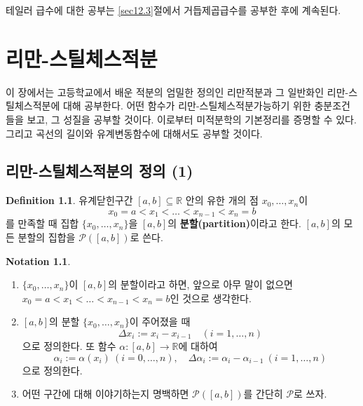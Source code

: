 \documentclass[11pt]{book}
\numberwithin{equation}{chapter}
\def\RR{\mathbb{R}}
\def\calP{\mathcal{P}}
\theoremstyle{definition}
\newtheorem{defn}[thm]{Definition}
\newtheorem{notn}[thm]{Notation}
\newenvironment{enum}
	{\begin{enumerate}[label=(\alph*), leftmargin=2\parindent]}
	{\end{enumerate}}
\begin{document}
테일러 급수에 대한 공부는 \ref{sec12.3}절에서 거듭제곱급수를 공부한 후에 계속된다.



\chapter{리만-스틸체스적분}

이 장에서는 고등학교에서 배운 적분의 엄밀한 정의인 리만적분과 그 일반화인 리만-스틸체스적분에 대해 공부한다. 어떤 함수가 리만-스틸체스적분가능하기 위한 충분조건들을 보고, 그 성질을 공부할 것이다. 이로부터 미적분학의 기본정리를 증명할 수 있다. 그리고 곡선의 길이와 유계변동함수에 대해서도 공부할 것이다.

\section{리만-스틸체스적분의 정의 (1)}

\begin{defn}
    유계닫힌구간 \([a, b] \subseteq \RR\) 안의 유한 개의 점 \(x_0, \ldots, x_n\)이
    \[
        x_0 = a < x_1 < \ldots < x_{n-1} < x_n = b
    \]
    를 만족할 때 집합 \(\{x_0, \ldots, x_n\}\)을 \([a, b]\)의 \textbf{분할(partition)}이라고 한다. \([a, b]\)의 모든 분할의 집합을 \(\calP([a, b])\)로 쓴다.
\end{defn}
\begin{notn}
    \quad

    \begin{enum}
        \item \(\{x_0, \ldots, x_n\}\)이 \([a, b]\)의 분할이라고 하면, 앞으로 아무 말이 없으면 \(x_0 = a < x_1 < \ldots < x_{n-1} < x_n = b\)인 것으로 생각한다.
        \item \([a, b]\)의 분할 \(\{x_0, \ldots, x_n\}\)이 주어졌을 때
        \[
            \Delta x_i := x_i - x_{i-1} \quad (i = 1, \ldots, n)
        \]
        으로 정의한다. 또 함수 \(\alpha : [a, b] \to \RR\)에 대하여
        \[
            \alpha_i := \alpha(x_i) \ (i = 0, \ldots, n), \quad \Delta \alpha_i := \alpha_i - \alpha_{i-1} \ (i = 1, \ldots, n)
        \]
        으로 정의한다.
        \item 어떤 구간에 대해 이야기하는지 명백하면 \(\calP([a, b])\)를 간단히 \(\calP\)로 쓰자.
    \end{enum}
\end{notn}
\end{document}
